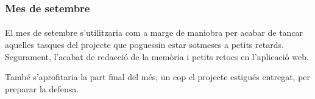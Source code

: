         \subsubsection{Mes de setembre}

            \paragraph{}
            El mes de setembre s'utilitzaria com a marge de maniobra per acabar de tancar aquelles tasques del projecte que poguessin estar sotmeses a petits retards. Segurament, l'acabat de redacció de la memòria i petits retocs en l'aplicació web.

            També s'aprofitaria la part final del més, un cop el projecte estigués entregat, per preparar la defensa.

